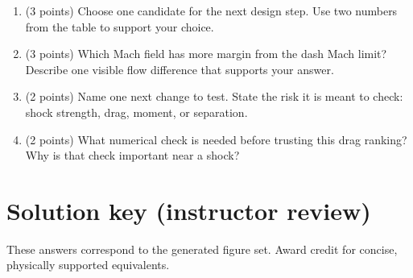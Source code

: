 \documentclass[11pt]{article}
\begin{document}
\begin{enumerate}
\item[5.] (3 points) Choose one candidate for the next design step. Use two numbers from the table to support your choice.
\item[6.] (3 points) Which Mach field has more margin from the dash Mach limit? Describe one visible flow difference that supports your answer.
\item[7.] (2 points) Name one next change to test. State the risk it is meant to check: shock strength, drag, moment, or separation.
\item[8.] (2 points) What numerical check is needed before trusting this drag ranking? Why is that check important near a shock?
\end{enumerate}

\newpage
\section*{Solution key (instructor review)}
\noindent These answers correspond to the generated figure set. Award credit for concise, physically supported equivalents.
\end{document}
